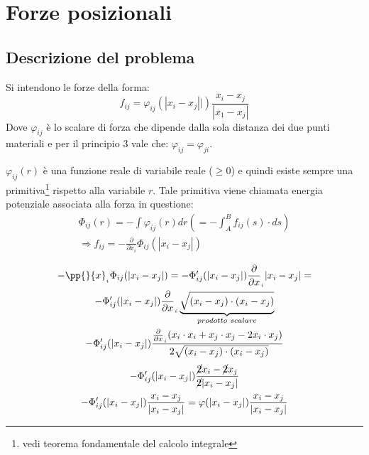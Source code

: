 \documentclass[Main.tex]{subfiles}
\begin{document}
\section{Forze posizionali}
\toc

\subsection{Descrizione del problema}
Si intendono le forze della forma:
\begin{equation}
	f_{ij}=\varphi_{ij}(|x_i-x_j||) \frac{x_i-x_j}{|x_1-x_j|}
\end{equation}
Dove $\varphi_{ij}$ è lo scalare di forza che dipende dalla sola distanza dei due punti materiali e per il principio 3 vale che: $\varphi_{ij}=\varphi_{ji}$.

\begin{osservazione}  
	$\varphi_{ij}(r)$ è una funzione reale di variabile reale ($\geq 0$) e quindi esiste sempre una primitiva\footnote{vedi teorema fondamentale del calcolo integrale} rispetto alla variabile $r$. Tale primitiva viene chiamata energia potenziale associata alla forza in questione: \\
\begin{gather}
	\Phi_{ij} (r) = - \int \varphi_{ij} (r) dr \left( = -\int_A^B f_{ij} (s) \cdot ds \right) \\ \Rightarrow f_{ij} = - \frac{\partial}{\partial x_i} \Phi_{ij} (|x_i - x_j|)
\end{gather}
\end{osservazione}

\newpage
\begin{dm} \label{ammetteprimitiva}
	\begin{gather}
		- \pp{}{x}_{_i} \Phi_{ij} (|x_i - x_j|) = -\Phi_{ij}' (|x_i -x_j|) \frac{\partial}{\partial x}_{_i} |x_i -x_j|= \\
		- \Phi_{ij}' (|x_i - x_j|) \frac{\partial}{\partial x}_{_i} \underbrace{\sqrt{{(x_i - x_j) \cdot (x_i - x_j)}}}_{prodotto \ scalare} \\
		- \Phi_{ij}' (|x_i - x_j|) \frac{\frac{\partial}{\partial x}_{_i} (x_i \cdot x_i + x_j \cdot x_j -2x_i \cdot x_j)}{\ 2\sqrt{(x_i - x_j)\cdot (x_i - x_j)}}\end{gather} \begin{gather}
		- \Phi_{ij}' (|x_i - x_j|) \frac{\cancel{2} x_i - \cancel{2}x_j}{\cancel{2} |x_i - x_j|} \\
		- \Phi_{ij}' (|x_i - x_j|) \frac{x_i - x_j}{|x_i - x_j|} = \varphi (|x_i - x_j|)\frac{x_i - x_j}{|x_i - x_j|} 
	\end{gather}
\end{dm}
\end{document}
